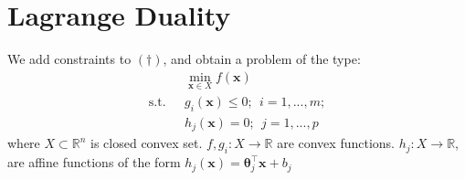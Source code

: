 \documentclass[a4paper, 11pt]{book}
\begin{document}
\section{Lagrange Duality}
We add constraints to $(\dag)$, and obtain a problem of the type:
\begin{equation}
  \begin{split}\label{eq:lagrangeprimal}
  &\min\limits_{\bm{x}\in X} f(\bm{x})\\
  \text{s.t.}~~~&g_i(\bm{x}) \leq 0;~~i=1,...,m;\\
  &h_j(\bm{x}) = 0;~~j=1,...,p
  \end{split}
\end{equation}
where $X\subset \mathbb{R}^n$ is closed convex set. $f, g_i: X\to \mathbb{R}$ are convex functions. $h_j: X \to \mathbb{R}$, are affine functions of the form $h_j(\bm{x})= \bm{\theta}_j^{\top} \bm{x}+ b_j$
\end{document}
